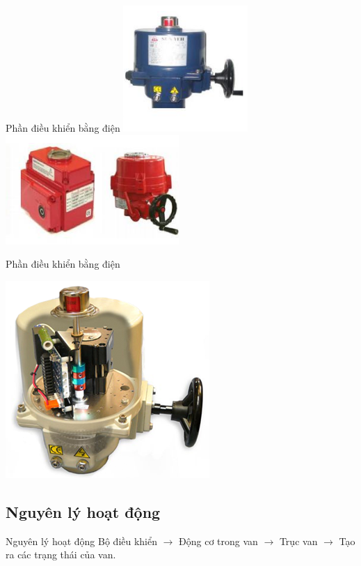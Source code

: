 \documentclass[20pt]{beamer}
\begin{document}
\begin{frame}{Phần điều khiển bằng điện}
\includegraphics[scale=.7]{images/phan-dieu-khien-bang-dien.png} 
\includegraphics[scale=.7]{images/phan-dieu-khien-bang-dien-2.png} 
\end{frame}

\begin{frame}{Phần điều khiển bằng điện}
\vspace{-.5cm}
\begin{center}
	\includegraphics[scale=.65]{images/van-dien-phan-dieu-khien.png} 
\end{center}
\end{frame}
\subsection*{Nguyên lý hoạt động}
\begin{frame}{Nguyên lý hoạt động}
\justifying
Bộ điều khiển $\longrightarrow$ Động cơ trong van $\longrightarrow$ Trục van $\longrightarrow$ Tạo ra các trạng thái của van.
\end{frame}
\end{document}
